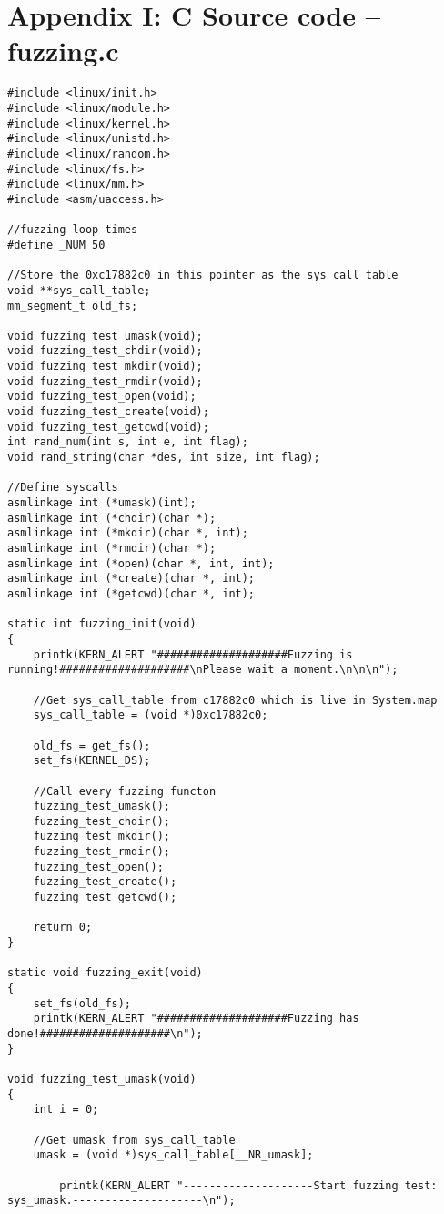\documentclass[twoside]{article}
\begin{document}
\section*{Appendix I: C Source code -- fuzzing.c}
\lstset{escapechar=@,style=customc}
\begin{lstlisting}
#include <linux/init.h>
#include <linux/module.h>
#include <linux/kernel.h>
#include <linux/unistd.h>
#include <linux/random.h>
#include <linux/fs.h>
#include <linux/mm.h>
#include <asm/uaccess.h>

//fuzzing loop times
#define _NUM 50

//Store the 0xc17882c0 in this pointer as the sys_call_table
void **sys_call_table;
mm_segment_t old_fs;

void fuzzing_test_umask(void);
void fuzzing_test_chdir(void);
void fuzzing_test_mkdir(void);
void fuzzing_test_rmdir(void);
void fuzzing_test_open(void);
void fuzzing_test_create(void);
void fuzzing_test_getcwd(void);
int rand_num(int s, int e, int flag);
void rand_string(char *des, int size, int flag);

//Define syscalls
asmlinkage int (*umask)(int);
asmlinkage int (*chdir)(char *);
asmlinkage int (*mkdir)(char *, int);
asmlinkage int (*rmdir)(char *);
asmlinkage int (*open)(char *, int, int);
asmlinkage int (*create)(char *, int);
asmlinkage int (*getcwd)(char *, int);

static int fuzzing_init(void)
{
	printk(KERN_ALERT "####################Fuzzing is running!####################\nPlease wait a moment.\n\n\n");

	//Get sys_call_table from c17882c0 which is live in System.map
	sys_call_table = (void *)0xc17882c0;

	old_fs = get_fs();
	set_fs(KERNEL_DS);
	
	//Call every fuzzing functon
	fuzzing_test_umask();
	fuzzing_test_chdir();
	fuzzing_test_mkdir();
	fuzzing_test_rmdir();
	fuzzing_test_open();
	fuzzing_test_create();
	fuzzing_test_getcwd();
	
	return 0;
}

static void fuzzing_exit(void)
{
	set_fs(old_fs);
	printk(KERN_ALERT "####################Fuzzing has done!####################\n");
}

void fuzzing_test_umask(void)
{
	int i = 0;

	//Get umask from sys_call_table
	umask = (void *)sys_call_table[__NR_umask];

       	printk(KERN_ALERT "--------------------Start fuzzing test: sys_umask.--------------------\n");


\end{lstlisting}
\end{document}
